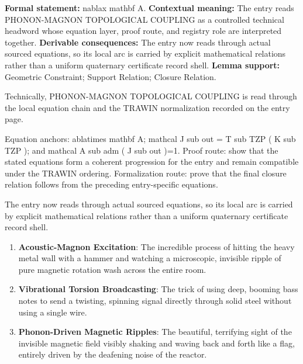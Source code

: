 \begingroup\footnotesize\setlength{\emergencystretch}{3em}\sloppy
\textbf{Formal statement:} nablax mathbf A. \textbf{Contextual meaning:} The entry reads PHONON-MAGNON TOPOLOGICAL COUPLING as a controlled technical headword whose equation layer, proof route, and registry role are interpreted together. \textbf{Derivable consequences:} The entry now reads through actual sourced equations, so its local arc is carried by explicit mathematical relations rather than a uniform quaternary certificate record shell. \textbf{Lemma support:} Geometric Constraint; Support Relation; Closure Relation.\par
\endgroup

Technically, PHONON-MAGNON TOPOLOGICAL COUPLING is read through the local equation chain and the TRAWIN normalization recorded on the entry page.

Equation anchors: ablatimes mathbf A; mathcal J sub out = T sub TZP ( K sub TZP ); and mathcal A sub adm ( J sub out )=1. Proof route: show that the stated equations form a coherent progression for the entry and remain compatible under the TRAWIN ordering. Formalization route: prove that the final closure relation follows from the preceding entry-specific equations.

The entry now reads through actual sourced equations, so its local arc is carried by explicit mathematical relations rather than a uniform quaternary certificate record shell.
\endgroup

\begin{enumerate}[leftmargin=1.6em,itemsep=6pt,topsep=4pt]
\item \textbf{Acoustic-Magnon Excitation}: The incredible process of hitting the heavy metal wall with a hammer and watching a microscopic, invisible ripple of pure magnetic rotation wash across the entire room.
\item \textbf{Vibrational Torsion Broadcasting}: The trick of using deep, booming bass notes to send a twisting, spinning signal directly through solid steel without using a single wire.
\item \textbf{Phonon-Driven Magnetic Ripples}: The beautiful, terrifying sight of the invisible magnetic field visibly shaking and waving back and forth like a flag, entirely driven by the deafening noise of the reactor.
\end{enumerate}

